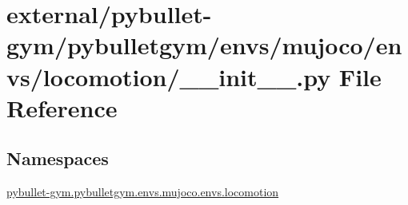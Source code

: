 \hypertarget{external_2pybullet-gym_2pybulletgym_2envs_2mujoco_2envs_2locomotion_2____init_____8py}{}\section{external/pybullet-\/gym/pybulletgym/envs/mujoco/envs/locomotion/\+\_\+\+\_\+init\+\_\+\+\_\+.py File Reference}
\label{external_2pybullet-gym_2pybulletgym_2envs_2mujoco_2envs_2locomotion_2____init_____8py}
\subsection*{Namespaces}
\begin{DoxyCompactItemize}
\item 
 \hyperlink{namespacepybullet-gym_1_1pybulletgym_1_1envs_1_1mujoco_1_1envs_1_1locomotion}{pybullet-\/gym.\+pybulletgym.\+envs.\+mujoco.\+envs.\+locomotion}
\end{DoxyCompactItemize}
